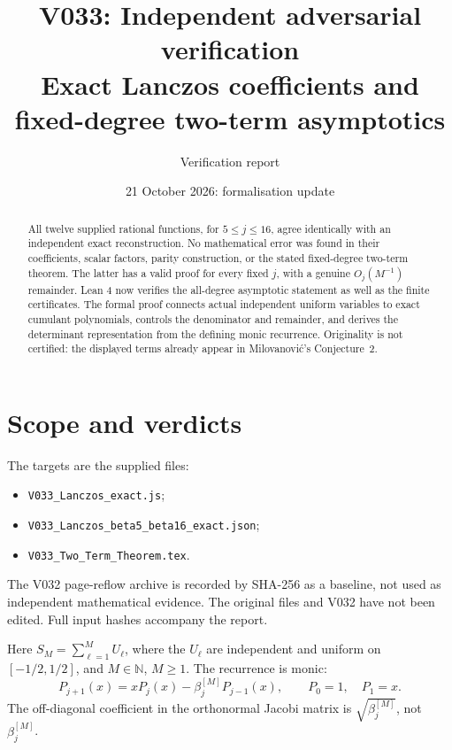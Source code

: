 \documentclass[11pt,a4paper]{article}
\title{V033: Independent adversarial verification\\
\large Exact Lanczos coefficients and fixed-degree two-term asymptotics}
\author{Verification report}
\date{21 October 2026: formalisation update}
\newcommand{\N}{\mathbb N}
\begin{document}
\maketitle
\begin{abstract}
All twelve supplied rational functions, for $5\leq j\leq16$, agree identically with an independent exact reconstruction. No mathematical error was found in their coefficients, scalar factors, parity construction, or the stated fixed-degree two-term theorem. The latter has a valid proof for every fixed $j$, with a genuine $O_j(M^{-1})$ remainder. Lean 4 now verifies the all-degree asymptotic statement as well as the finite certificates. The formal proof connects actual independent uniform variables to exact cumulant polynomials, controls the denominator and remainder, and derives the determinant representation from the defining monic recurrence. Originality is not certified: the displayed terms already appear in Milovanovi\'c's Conjecture~2.
\end{abstract}

\section{Scope and verdicts}
The targets are the supplied files:
\begin{itemize}
\item \texttt{V033\_Lanczos\_exact.js};
\item \texttt{V033\_Lanczos\_beta5\_beta16\_exact.json};
\item \texttt{V033\_Two\_Term\_Theorem.tex}.
\end{itemize}
The V032 page-reflow archive is recorded by SHA-256 as a baseline, not used as independent mathematical evidence. The original files and V032 have not been edited. Full input hashes accompany the report.

Here $S_M=\sum_{\ell=1}^M U_\ell$, where the $U_\ell$ are independent and uniform on $[-1/2,1/2]$, and $M\in\N$, $M\geq1$. The recurrence is monic:
\[
P_{j+1}(x)=xP_j(x)-\beta_j^{[M]}P_{j-1}(x),\qquad P_0=1,\quad P_1=x.
\]
The off-diagonal coefficient in the orthonormal Jacobi matrix is $\sqrt{\beta_j^{[M]}}$, not $\beta_j^{[M]}$.
\end{document}
